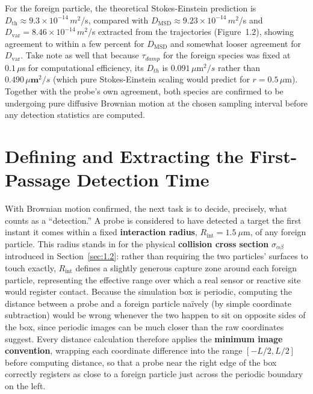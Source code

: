 For the foreign particle, the theoretical Stokes-Einstein prediction is $D_\text{th} \approx 9.3\times 10^{-14} \,m^2$/s, compared with $D_\text{MSD} \approx 9.23\times10^{-14}\, m^2$/s and $D_\text{var} = 8.46\times10^{-14}\,m^2$/s extracted from the trajectories (Figure~1.2), showing agreement to within a few percent for $D_\text{MSD}$ and somewhat looser agreement for $D_\text{var}$. Take note as well that because $\tau_{damp}$ for the foreign species was fixed at $0.1\,\mu$s for computational efficiency, its $D_{th}$ is $0.091\,\mu\text{m}^2/s$ rather than $0.490\,\mu\textbf{m}^2/s$ (which pure Stokes-Einstein scaling would predict for $r=0.5\,\mu$m). Together with the probe's own agreement, both species are confirmed to be undergoing pure diffusive Brownian motion at the chosen sampling interval before any detection statistics are computed.

\section{Defining and Extracting the First-Passage Detection Time}
\label{sec:3.8}
With Brownian motion confirmed, the next task is to decide, precisely, what counts as a ``detection.'' A probe is considered to have detected a target the first instant it comes within a fixed \textbf{interaction radius}, $R_\text{int} = 1.5~\mu\text{m}$, of any foreign particle. This radius stands in for the physical \textbf{collision cross section} $\sigma_{\alpha\beta}$ introduced in Section~\ref{sec:1.2}: rather than requiring the two particles' surfaces to touch exactly, $R_\text{int}$ defines a slightly generous capture zone around each foreign particle, representing the effective range over which a real sensor or reactive site would register contact. Because the simulation box is periodic,
computing the distance between a probe and a foreign particle na\"ively (by simple coordinate subtraction) would be wrong whenever the two happen to sit on opposite sides of the box, since periodic images can be much closer than the raw coordinates suggest. Every distance calculation therefore applies the \textbf{minimum image convention}, wrapping each coordinate difference into the range $[-L/2, L/2]$ before computing distance, so that a probe near the right edge of the box correctly registers as close to a foreign particle just across the periodic boundary on the left.

